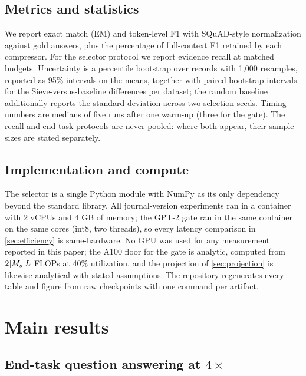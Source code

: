\documentclass[review,12pt]{elsarticle}
\DeclarePairedDelimiter\abs{\lvert}{\rvert}
\theoremstyle{remark}
\newcommand{\method}{Sieve}
\begin{document}
\subsection{Metrics and statistics}
We report exact match (EM) and token-level F1 with SQuAD-style
normalization \citep{yang2018hotpotqa} against gold answers, plus the
percentage of full-context F1 retained by each compressor. For the
selector protocol we report evidence recall at matched budgets.
Uncertainty is a percentile bootstrap over records with 1{,}000
resamples, reported as 95\% intervals on the means, together with
paired bootstrap intervals for the \method{}-versus-baseline
differences per dataset; the random baseline additionally reports the
standard deviation across two selection seeds. Timing numbers are
medians of five runs after one warm-up (three for the gate). The
recall and end-task protocols are never pooled: where both appear,
their sample sizes are stated separately.

\subsection{Implementation and compute}
The selector is a single Python module with NumPy as its only
dependency beyond the standard library. All journal-version
experiments ran in a container with 2 vCPUs and 4 GB of memory; the
GPT-2 gate ran in the same container on the same cores (int8, two
threads), so every latency comparison in \autoref{sec:efficiency} is
same-hardware. No GPU was used for any measurement reported in this
paper; the A100 floor for the gate is analytic, computed from
$2\abs{M_s} L$ FLOPs at 40\% utilization, and the projection of
\autoref{sec:projection} is likewise analytical with stated
assumptions. The repository regenerates every table and figure from
raw checkpoints with one command per artifact.

\section{Main results}
\label{sec:results}

\subsection{End-task question answering at \texorpdfstring{$4\times$}{4x}}
\label{sec:qa}
\end{document}
